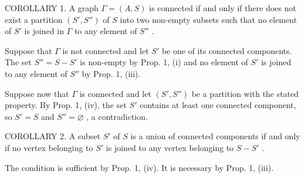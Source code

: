 COROLLARY 1. A graph \(\Gamma = (A, S)\) is connected if and only if there does not exist a partition \((S', S'')\) of \(S\) into two non-empty subsets such that no element of \(S'\) is joined in \(\Gamma\) to any element of \(S''\) .

Suppose that \(\Gamma\) is not connected and let \(S'\) be one of its connected components. The set \(S'' = S - S'\) is non-empty by Prop. 1, (i) and no element of \(S'\) is joined to any element of \(S''\) by Prop. 1, (iii).

Suppose now that \(\Gamma\) is connected and let \((S', S'')\) be a partition with the stated property. By Prop. 1, (iv), the set \(S'\) contains at least one connected component, so \(S' = S\) and \(S'' = \varnothing\) , a contradiction.

COROLLARY 2. A subset \(S'\) of \(S\) is a union of connected components if and only if no vertex belonging to \(S'\) is joined to any vertex belonging to \(S - S'\) .

The condition is sufficient by Prop. 1, (iv). It is necessary by Prop. 1, (iii).


